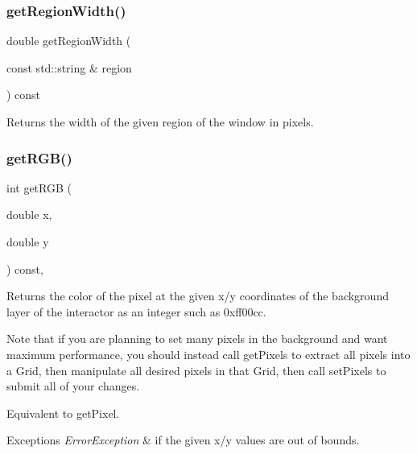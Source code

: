 \subsubsection{\texorpdfstring{get\+Region\+Width()}{getRegionWidth()}\hspace{0.1cm}{\footnotesize\ttfamily [2/2]}}
{\footnotesize\ttfamily double get\+Region\+Width (\begin{DoxyParamCaption}\item[{const std\+::string \&}]{region }\end{DoxyParamCaption}) const\hspace{0.3cm}{\ttfamily [virtual]}}



Returns the width of the given region of the window in pixels. 

\mbox{\label{classsgl_1_1GDrawingSurface_a9e983467cf0c97cfd62433a8471570dc}} 
\subsubsection{\texorpdfstring{get\+R\+G\+B()}{getRGB()}}
{\footnotesize\ttfamily int get\+R\+GB (\begin{DoxyParamCaption}\item[{double}]{x,  }\item[{double}]{y }\end{DoxyParamCaption}) const\hspace{0.3cm}{\ttfamily [virtual]}, {\ttfamily [inherited]}}



Returns the color of the pixel at the given x/y coordinates of the background layer of the interactor as an integer such as 0xff00cc. 

Note that if you are planning to set many pixels in the background and want maximum performance, you should instead call get\+Pixels to extract all pixels into a Grid, then manipulate all desired pixels in that Grid, then call set\+Pixels to submit all of your changes.

Equivalent to get\+Pixel.


\begin{DoxyExceptions}{Exceptions}
{\em Error\+Exception} & if the given x/y values are out of bounds. \\
\hline
\end{DoxyExceptions}
\mbox{\label{classsgl_1_1GDrawingSurface_a456d3582acc3544f37d939f5cb8802fe}} 
